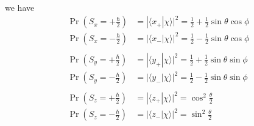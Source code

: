 we have
\begin{align*}
\Pr\left(S_x=+\tfrac{\hbar}{2}\right)
&=|\langle x_+|\chi\rangle|^2=\tfrac{1}{2}+\tfrac{1}{2}\sin\theta\cos\phi
\\
\Pr\left(S_x=-\tfrac{\hbar}{2}\right)
&=|\langle x_-|\chi\rangle|^2=\tfrac{1}{2}-\tfrac{1}{2}\sin\theta\cos\phi
\\
\\
\Pr\left(S_y=+\tfrac{\hbar}{2}\right)
&=|\langle y_+|\chi\rangle|^2=\tfrac{1}{2}+\tfrac{1}{2}\sin\theta\sin\phi
\\
\Pr\left(S_y=-\tfrac{\hbar}{2}\right)
&=|\langle y_-|\chi\rangle|^2=\tfrac{1}{2}-\tfrac{1}{2}\sin\theta\sin\phi
\\
\\
\Pr\left(S_z=+\tfrac{\hbar}{2}\right)
&=|\langle z_+|\chi\rangle|^2=\cos^2\tfrac{\theta}{2}
\\
\Pr\left(S_z=-\tfrac{\hbar}{2}\right)
&=|\langle z_-|\chi\rangle|^2=\sin^2\tfrac{\theta}{2}
\end{align*}


